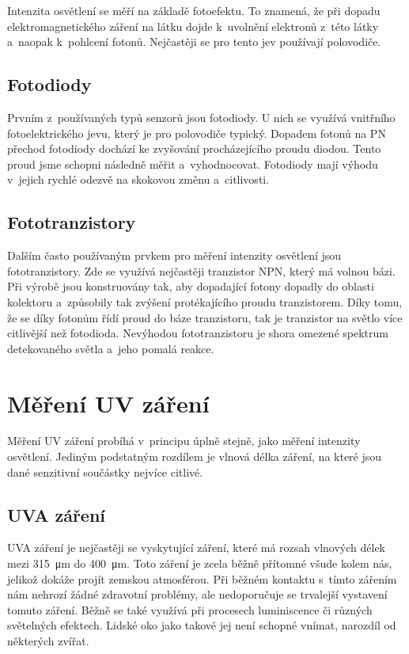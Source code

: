 Intenzita osvětlení se měří na základě fotoefektu. To znamená, že při dopadu elektromagnetického záření na látku dojde k~uvolnění elektronů z~této látky a~naopak k~pohlcení fotonů. Nejčastěji se pro tento jev používají polovodiče.

\subsection{Fotodiody}

Prvním z~používaných typů senzorů jsou fotodiody. U nich se využívá vnitřního fotoelektrického jevu, který je pro polovodiče typický. Dopadem fotonů na PN přechod fotodiody dochází ke zvyšování procházejícího proudu diodou. Tento proud jsme schopni následně měřit a~vyhodnocovat. Fotodiody mají výhodu v~jejich rychlé odezvě na skokovou změnu a~citlivosti.

\subsection{Fototranzistory}

Dalším často používaným prvkem pro měření intenzity osvětlení jsou fototranzistory. Zde se využívá nejčastěji tranzistor NPN, který má volnou bázi. Při výrobě jsou konstruovány tak, aby dopadající fotony dopadly do oblasti kolektoru a~způsobily tak zvýšení protékajícího proudu tranzistorem. Díky tomu, že se díky fotonům řídí proud do báze tranzistoru, tak je tranzistor na světlo více citlivější než fotodioda. Nevýhodou fototranzistoru je shora omezené spektrum detekovaného světla a~jeho pomalá reakce.

\section{Měření UV záření}

Měření UV záření probíhá v~principu úplně stejně, jako měření intenzity osvětlení. Jediným podstatným rozdílem je vlnová délka záření, na které jsou dané senzitivní součástky nejvíce citlivé. 

\subsection{UVA záření}

UVA záření je nejčastěji se vyskytující záření, které má rozsah vlnových délek mezi \SI{315}{\micro\metre} do \SI{400}{\micro\metre}. Toto záření je zcela běžně přítomné všude kolem nás, jelikož dokáže projít zemskou atmosférou. Při běžném kontaktu s~tímto zářením nám nehrozí žádné zdravotní problémy, ale nedoporučuje se trvalejší vystavení tomuto záření. Běžně se také využívá při procesech luminiscence či různých světelných efektech. Lidské oko jako takové jej není schopné vnímat, narozdíl od některých zvířat.

